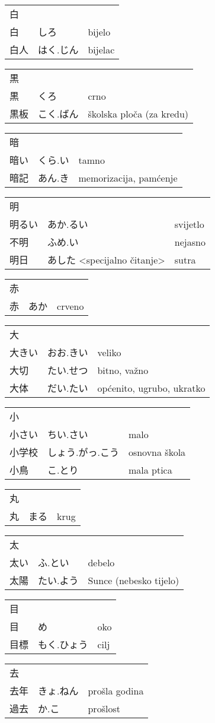 

\newenvironment{dictentry}[1]{
	\begin{tabular}{p{2cm} p{3cm} p{10cm}}
		#1 &&\\
}{
	\end{tabular}
	\vspace{20pt}
}

\newcommand{\example}[3]{
	\hspace*{\fill}#1 & #2 & #3\\
}

\author{ロボット君}


\begin{dictentry}{白}
\example{白}{しろ}{bijelo}
\example{白人}{はく.じん}{bijelac}
\end{dictentry}

\begin{dictentry}{黒}
\example{黒}{くろ}{crno}
\example{黒板}{こく.ばん}{školska ploča (za kredu)}
\end{dictentry}

\begin{dictentry}{暗}
\example{暗い}{くら.い}{tamno}
\example{暗記}{あん.き}{memorizacija, pamćenje}
\end{dictentry}

\begin{dictentry}{明}
\example{明るい}{あか.るい}{svijetlo}
\example{不明}{ふめ.い}{nejasno}
\example{明日}{あした <specijalno čitanje>}{sutra}
\end{dictentry}

\begin{dictentry}{赤}
\example{赤}{あか}{crveno}
\end{dictentry}

\begin{dictentry}{大}
\example{大きい}{おお.きい}{veliko}
\example{大切}{たい.せつ}{bitno, važno}
\example{大体}{だい.たい}{općenito, ugrubo, ukratko}
\end{dictentry}

\begin{dictentry}{小}
\example{小さい}{ちい.さい}{malo}
\example{小学校}{しょう.がっ.こう}{osnovna škola}
\example{小鳥}{こ.とり}{mala ptica}
\end{dictentry}

\begin{dictentry}{丸}
\example{丸}{まる}{krug}
\end{dictentry}

\begin{dictentry}{太}
\example{太い}{ふ.とい}{debelo}
\example{太陽}{たい.よう}{Sunce (nebesko tijelo)}
\end{dictentry}

\begin{dictentry}{目}
\example{目}{め}{oko}
\example{目標}{もく.ひょう}{cilj}
\end{dictentry}

\begin{dictentry}{去}
\example{去年}{きょ.ねん}{prošla godina}
\example{過去}{か.こ}{prošlost}
\end{dictentry}

